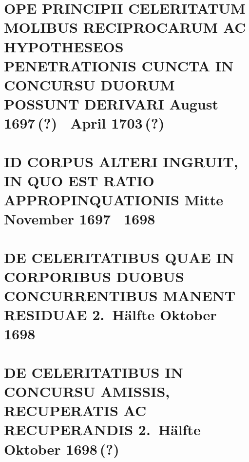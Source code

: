 \documentclass[%
fontsize=10pt,
]{scrbook}
\DeclareRobustCommand{\bracks}[1]{%
\textup{\lbrack}#1\textup{\rbrack}}
\begin{document}
\chapter[tocentry={Ope principii celeritatum molibus reciprocarum ac hypotheseos penetrationis cuncta in concursu duorum possunt derivari
\enskip \bracks{August 1697\,(?) \textendash\ April 1703\,(?)}},
head={Principia celeritatum molibus reciprocarum ac penetrationis}]%
{\MakeUppercase{Ope principii celeritatum molibus reciprocarum ac hypotheseos penetrationis cuncta in concursu duorum possunt derivari}
\newline \bracks{August 1697\,(?) \textendash\ April 1703\,(?)}}

\label{58297}




\chapter[tocentry={Id corpus alteri ingruit, in quo est ratio appropinquationis 
\enskip \bracks{Mitte November 1697 \textendash\ 1698}},
head={Id corpus alteri ingruit, in quo est ratio appropinquationis}]%
{\MakeUppercase{Id corpus alteri ingruit, in quo est ratio appropinquationis}
\newline \bracks{Mitte November 1697 \textendash\ 1698}}
\label{60360}
   



\chapter[tocentry={De celeritatibus quae in corporibus duobus concurrentibus manent residuae 
\enskip \bracks{2.\ Hälfte Oktober 1698}},
head={De celeritatibus quae \bracks{...} manent residuae}]%
{\MakeUppercase{De celeritatibus quae in corporibus duobus concurrentibus manent residuae}
\newline \bracks{2.\ Hälfte Oktober 1698}}
\label{60358}




\chapter[tocentry={De celeritatibus in concursu amissis, recuperatis ac recuperandis 
\enskip \bracks{2.\ Hälfte Oktober 1698\,(?)}}, %
head={De celeritatibus in concursu amissis, recuperatis ac recuperandis}]%
{\MakeUppercase{De celeritatibus in concursu amissis, recuperatis ac recuperandis} 
\newline \bracks{2.\ Hälfte Oktober 1698\,(?)}}
\label{60362}    

\end{document}
